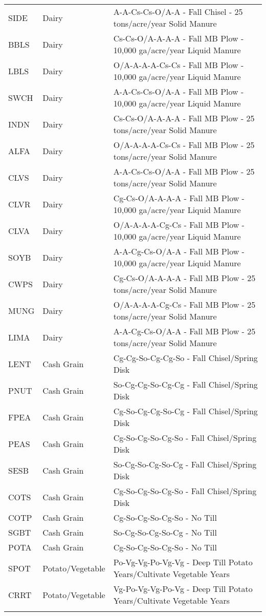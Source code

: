 \begin{landscape}
\begin{longtable}{l l l}
  SIDE & Dairy & A-A-Cs-Cs-O/A-A - Fall Chisel - 25 tons/acre/year Solid Manure  \\ 
  BBLS & Dairy & Cs-Cs-O/A-A-A-A - Fall MB Plow - 10,000 ga/acre/year Liquid Manure  \\ 
  LBLS & Dairy & O/A-A-A-A-Cs-Cs - Fall MB Plow - 10,000 ga/acre/year Liquid Manure  \\ 
  SWCH & Dairy & A-A-Cs-Cs-O/A-A - Fall MB Plow - 10,000 ga/acre/year Liquid Manure  \\ 
  INDN & Dairy & Cs-Cs-O/A-A-A-A - Fall MB Plow - 25 tons/acre/year Solid Manure  \\ 
  ALFA & Dairy & O/A-A-A-A-Cs-Cs - Fall MB Plow - 25 tons/acre/year Solid Manure  \\ 
  CLVS & Dairy & A-A-Cs-Cs-O/A-A - Fall MB Plow - 25 tons/acre/year Solid Manure  \\ 
  CLVR & Dairy & Cg-Cs-O/A-A-A-A - Fall MB Plow - 10,000 ga/acre/year Liquid Manure  \\ 
  CLVA & Dairy & O/A-A-A-A-Cg-Cs - Fall MB Plow - 10,000 ga/acre/year Liquid Manure  \\ 
  SOYB & Dairy & A-A-Cg-Cs-O/A-A - Fall MB Plow - 10,000 ga/acre/year Liquid Manure  \\ 
  CWPS & Dairy & Cg-Cs-O/A-A-A-A - Fall MB Plow - 25 tons/acre/year Solid Manure  \\ 
  MUNG & Dairy & O/A-A-A-A-Cg-Cs - Fall MB Plow - 25 tons/acre/year Solid Manure  \\ 
  LIMA & Dairy & A-A-Cg-Cs-O/A-A - Fall MB Plow - 25 tons/acre/year Solid Manure  \\ 
  LENT & Cash Grain & Cg-Cg-So-Cg-Cg-So - Fall Chisel/Spring Disk  \\ 
  PNUT & Cash Grain & So-Cg-Cg-So-Cg-Cg - Fall Chisel/Spring Disk  \\ 
  FPEA & Cash Grain & Cg-So-Cg-Cg-So-Cg - Fall Chisel/Spring Disk  \\ 
  PEAS & Cash Grain & Cg-So-Cg-So-Cg-So - Fall Chisel/Spring Disk  \\ 
  SESB & Cash Grain & So-Cg-So-Cg-So-Cg - Fall Chisel/Spring Disk  \\ 
  COTS & Cash Grain & Cg-So-Cg-So-Cg-So - Fall Chisel/Spring Disk  \\ 
  COTP & Cash Grain & Cg-So-Cg-So-Cg-So - No Till  \\ 
  SGBT & Cash Grain & So-Cg-So-Cg-So-Cg - No Till  \\ 
  POTA & Cash Grain & Cg-So-Cg-So-Cg-So - No Till  \\ 
  SPOT & Potato/Vegetable & Po-Vg-Vg-Po-Vg-Vg - Deep Till Potato Years/Cultivate Vegetable Years  \\ 
  CRRT & Potato/Vegetable & Vg-Po-Vg-Vg-Po-Vg - Deep Till Potato Years/Cultivate Vegetable Years  \\ 
\label{tab:lnd_mgt_def}
\end{longtable}
\end{landscape}